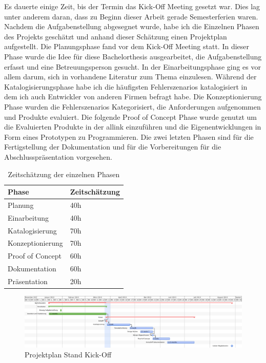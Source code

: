 
Es dauerte einige Zeit, bis der Termin das Kick-Off Meeting gesetzt war. Dies lag unter anderem daran, dass zu Beginn dieser Arbeit gerade Semesterferien waren. Nachdem die Aufgabenstellung abgesegnet wurde, habe ich die Einzelnen Phasen des Projekts geschätzt und anhand dieser Schätzung einen Projektplan aufgestellt. Die Planungsphase fand vor dem Kick-Off Meeting statt. In dieser Phase wurde die Idee für diese Bachelorthesis ausgearbeitet, die Aufgabenstellung erfasst und eine Betreuungsperson gesucht. In der Einarbeitungsphase ging es vor allem darum, sich in vorhandene Literatur zum Thema einzulesen. Während der Katalogisierungsphase habe ich die häufigsten Fehlerszenarios katalogisiert in dem ich auch Entwickler von anderen Firmen befragt habe. Die Konzeptionierung Phase wurden die Fehlerszenarios Kategorisiert, die Anforderungen aufgenommen und Produkte evaluiert. Die folgende Proof of Concept Phase wurde genutzt um die Evaluierten Produkte in der allink einzuführen und die Eigenentwicklungen in Form eines Prototypen zu Programmieren. Die zwei letzten Phasen sind für die Fertigstellung der Dokumentation und für die Vorbereitungen für die Abschlusspräsentation vorgesehen.

\begin{table}[h]
  \centering
  \begin{tabular}{ll}
  \toprule
    Phase & Zeitschätzung\\
  \hline
    Planung & 40h\\
  \hline
    Einarbeitung & 40h\\
  \hline
    Katalogisierung & 70h\\
  \hline
    Konzeptionierung & 70h\\
  \hline
    Proof of Concept & 60h\\
  \hline
    Dokumentation & 60h\\
  \hline
    Präsentation & 20h\\
  \bottomrule
  \end{tabular}
  \caption{Zeitschätzung der einzelnen Phasen}
  \label{tab:zeitschätzung}
\end{table}


\begin{figure}[p]
\centering
\includegraphics[width=1\textheight, angle=90]{images/projektplan.pdf}
\caption{Projektplan Stand Kick-Off}
\label{fig:projektplan}
\end{figure}

